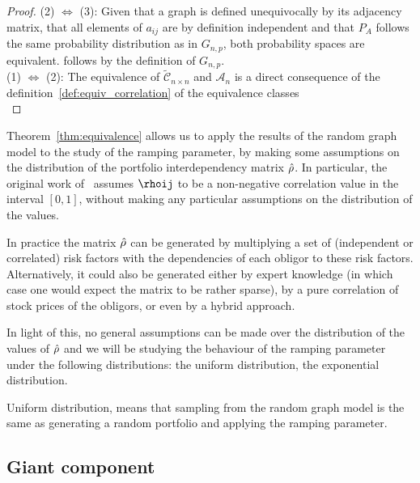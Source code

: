\begin{proof}

(2) $\Leftrightarrow$ (3):
Given that a graph is defined unequivocally by its adjacency matrix, that all elements of $a_{ij}$ are by definition independent and that $P_A$ follows the same probability distribution as in $G_{n,p}$, both probability spaces are equivalent.
 follows by the definition of $G_{n,p}$.
\\
(1) $\Leftrightarrow$ (2):
The equivalence of $\widetilde{\mathcal{C}}_{n\times n}$ and $\mathcal{A}_n$ is a direct consequence of the definition~\ref{def:equiv_correlation} of the equivalence classes \\


\end{proof}




\vspace{0.5cm}

Theorem~\vref{thm:equivalence} allows us to apply the results of the random graph model to the study of the ramping parameter, by making some assumptions on the distribution of the portfolio interdependency matrix $\hat{\rho}$.
In particular, the original work of~\cite{Sindel:2009vd} assumes $\rhoij$ to be a non-negative correlation value in the interval $[0,1]$, without making any particular assumptions on the distribution of the values.

In practice the matrix $\hat{\rho}$ can be generated by multiplying a set of (independent or correlated) risk factors with the dependencies of each obligor to these risk factors.
Alternatively, it could also be generated either by expert knowledge (in which case one would expect the matrix to be rather sparse), by a pure correlation of stock prices of the obligors, or even by a hybrid approach.

In light of this, no general assumptions can be made over the distribution of the values of $\hat{\rho}$ and we will be studying the behaviour of the ramping parameter under the following distributions:
the uniform distribution,
the exponential distribution.


Uniform distribution, means that sampling from the random graph model is the same as generating a random portfolio and applying the ramping parameter.


\subsection{Giant component} %
\label{sub:giant_component}

